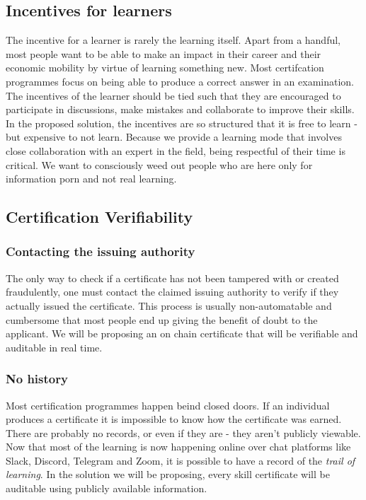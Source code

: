 \documentclass{article}
\begin{document}
    \subsection{Incentives for learners}
      The incentive for a learner is rarely the learning itself. Apart from a handful, most people want to be able to make an impact in their career and their economic mobility by virtue of learning something new. 
      Most certifcation programmes focus on being able to produce a correct answer in an examination. The incentives of the learner should be tied such that they are encouraged to participate in discussions, make mistakes and collaborate to improve their skills.
      \break
      In the proposed solution, the incentives are so structured that it is free to learn - but expensive to not learn. Because we provide a learning mode that involves close collaboration with an expert in the field, being respectful of their time is critical. 
      We want to consciously weed out people who are here only for information porn and not real learning.
    \subsection{Certification Verifiability}
      \subsubsection{Contacting the issuing authority}
        The only way to check if a certificate has not been tampered with or created fraudulently, one must contact the claimed issuing authority to verify if they actually issued the certificate. 
        This process is usually non-automatable and cumbersome that most people end up giving the benefit of doubt to the applicant. 
        \break
        We will be proposing an on chain certificate that will be verifiable and auditable in real time.
      \subsubsection{No history}
        Most certification programmes happen beind closed doors. If an individual produces a certificate it is impossible to know how the certificate was earned. There are probably no records, or even if they are - they aren't publicly viewable. 
        \break
        Now that most of the learning is now happening online over chat platforms like Slack, Discord, Telegram and Zoom, it is possible to have a record of the \textit{trail of learning}. In the solution we will be proposing, every skill certificate will be auditable using publicly available information.
\end{document}

